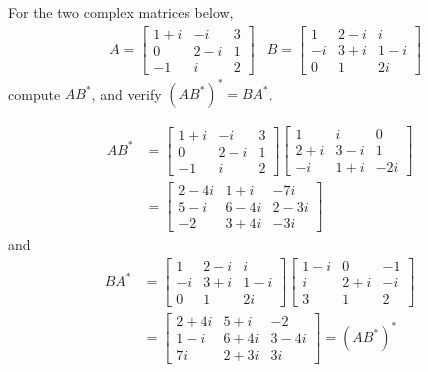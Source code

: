 \begin{Exercise}
For the two complex matrices below,
\begin{align*}
& A=
\begin{bmatrix}
1+i & -i & 3 \\
0 & 2-i & 1 \\
-1 & i & 2
\end{bmatrix}
& B=
\begin{bmatrix}
1 & 2-i & i \\
-i & 3+i & 1-i \\
0 & 1 & 2i
\end{bmatrix}
\end{align*}
compute $AB^*$, and verify $(AB^*)^* = BA^*$.
\end{Exercise}
\begin{Answer}
\begin{align*}
AB^* &=
\begin{bmatrix}
1+i & -i & 3 \\
0 & 2-i & 1 \\
-1 & i & 2
\end{bmatrix}
\begin{bmatrix}
1 & i & 0 \\ 
2+i & 3-i & 1 \\ 
-i & 1+i & -2i
\end{bmatrix} \\
&=
\begin{bmatrix}
2-4i&1+i&-7i\\ 
5-i&6-4i&2-3i\\ 
-2&3+4i&-3i
\end{bmatrix}
\end{align*}
and
\begin{align*}
BA^* &= 
\begin{bmatrix}
1 & 2-i & i \\
-i & 3+i & 1-i \\
0 & 1 & 2i
\end{bmatrix}
\begin{bmatrix}
1-i & 0 & -1\\
i & 2+i & -i\\
3 & 1 & 2
\end{bmatrix} \\
&= 
\begin{bmatrix}
2+4i&5+i&-2\\ 
1-i&6+4i&3-4i\\ 
7i&2+3i&3i
\end{bmatrix} = (AB^*)^*
\end{align*}
\end{Answer}

